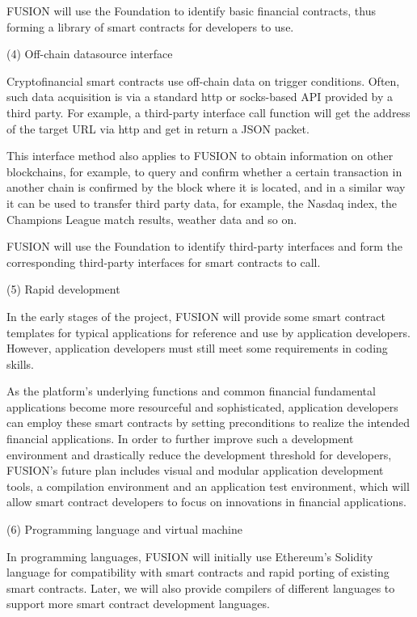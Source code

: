 \documentclass[a4paper,12pt]{article}
\begin{document}
FUSION will use the Foundation to identify basic financial contracts, thus forming a library of smart contracts for developers to use.

(4) Off-chain datasource interface

Cryptofinancial smart contracts use off-chain data on trigger conditions. Often, such data acquisition is via a standard http or socks-based API provided by a third party. For example, a third-party interface call function will get the address of the target URL via http and get in return a JSON packet.

This interface method also applies to FUSION to obtain information on other blockchains, for example, to query and confirm whether a certain transaction in another chain is confirmed by the block where it is located, and in a similar way it can be used to transfer third party data, for example, the Nasdaq index, the Champions League match results, weather data and so on.

FUSION will use the Foundation to identify third-party interfaces and form the corresponding third-party interfaces for smart contracts to call.

(5) Rapid development

In the early stages of the project, FUSION will provide some smart contract templates for typical applications for reference and use by application developers. However, application developers must still meet some requirements in coding skills.

As the platform's underlying functions and common financial fundamental applications become more resourceful and sophisticated, application developers can employ these smart contracts by setting preconditions to realize the intended financial applications. In order to further improve such a development environment and drastically reduce the development threshold for developers, FUSION's future plan includes visual and modular application development tools, a compilation environment and an application test environment, which will allow smart contract developers to focus on innovations in financial applications.

(6) Programming language and virtual machine

In programming languages, FUSION will initially use Ethereum's Solidity language for compatibility with smart contracts and rapid porting of existing smart contracts. Later, we will also provide compilers of different languages to support more smart contract development languages.
\end{document}

